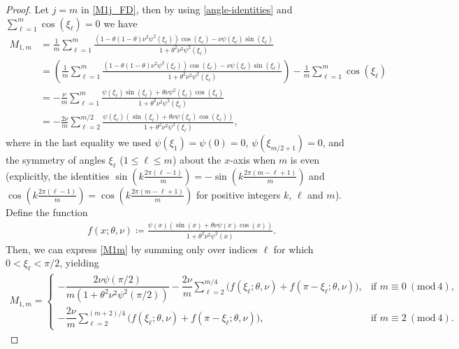 \documentclass[a4paper]{article}
\newcommand{\Mod}[1]{\ (\mathrm{mod}\ #1)}
\begin{document}
\begin{description}[style=unboxed,leftmargin=0cm]
\begin{proof}
	Let $j = m$ in \eqref{M1j_FD}, then by using \eqref{angle-identities} and
	$\sum_{\ell=1}^m \cos(\xi_\ell) = 0$ we have
	\begin{align}\label{M1m}
		M_{1,m} &= \frac{1}{m} \sum_{\ell=1}^{m} \frac{\left(1-\theta(1-\theta)\nu^2\psi^2(\xi_\ell)
					\right)\cos(\xi_\ell)-\nu\psi(\xi_\ell)\sin(\xi_\ell)}{1+\theta^2\nu^2\psi^2(\xi_\ell)} \nonumber \\
					&= \left(\frac{1}{m} \sum_{\ell=1}^{m} \frac{\left(1-\theta(1-\theta)\nu^2\psi^2(\xi_\ell)\right)
					\cos(\xi_\ell) - \nu\psi(\xi_\ell)\sin(\xi_\ell)}{1+\theta^2\nu^2\psi^2(\xi_\ell)}\right) -
					\frac{1}{m}\sum_{\ell=1}^m \cos(\xi_\ell) \nonumber \\
					&= -\frac{\nu}{m} \sum_{\ell=1}^{m} \frac{\psi(\xi_\ell)\sin(\xi_\ell)+\theta\nu\psi^2(\xi_\ell)
					\cos(\xi_\ell) }{1+\theta^2\nu^2\psi^2(\xi_\ell)} \nonumber \\
					&= -\frac{2\nu}{m} \sum_{\ell=2}^{m/2} \frac{\psi(\xi_\ell)(\sin(\xi_\ell)+\theta\nu\psi(\xi_\ell)
					\cos(\xi_\ell))}{1+\theta^2\nu^2\psi^2(\xi_\ell)},
	\end{align}
	where in the last equality we used $\psi(\xi_1) = \psi(0) = 0$,  $\psi(\xi_{m/2+1}) =  0$, and the symmetry
	of angles $\xi_\ell$ ($1 \le \ell \le m$) about the $x$-axis when $m$ is even (explicitly, the identities
	$\sin\left(k\frac{2\pi(\ell-1)}{m}\right)=-\sin\left(k\frac{2\pi(m-\ell+1)}{m}\right)$ and
	$\cos\left(k\frac{2\pi(\ell-1)}{m}\right)=\cos\left(k\frac{2\pi(m-\ell+1)}{m}\right)$ for positive integers
	$k$, $\ell$ and $m$).
	Define the function 
	\begin{align*}
		f(x; \theta, \nu) \coloneqq \frac{\psi(x)(\sin(x)+\theta\nu\psi(x)\cos(x))}{1+\theta^2\nu^2\psi^2(x)}.
	\end{align*}
	Then, we can express \eqref{M1m} by summing only over indices $\ell$ for which $0 < \xi_\ell  < \pi/2$,
	yielding
	\ifjournal
		\begin{align}\label{M1mnew}
			M_{1,m} = \begin{cases}
								-\dfrac{2\nu\psi(\pi/2)}{m\left(1+\theta^2\nu^2\psi^2(\pi/2)\right)} -
									\dfrac{2\nu}{m} \displaystyle{\sum\limits_{\ell=2}^{m/4}}
									\Big(f(\xi_\ell; \theta, \nu) + f(\pi-\xi_\ell; \theta, \nu) \Big),
									& \text{if } m \equiv 0 \Mod{4}, \\[20pt]
								-\dfrac{2\nu}{m} \displaystyle{\sum\limits_{\ell=2}^{(m+2)/4}}
									\Big(f(\xi_\ell; \theta, \nu) + f(\pi-\xi_\ell; \theta, \nu)\Big),
									& \text{if } m \equiv 2 \Mod{4}.
							\end{cases}

\end{align}
\end{proof}
\end{description}
\end{document}
